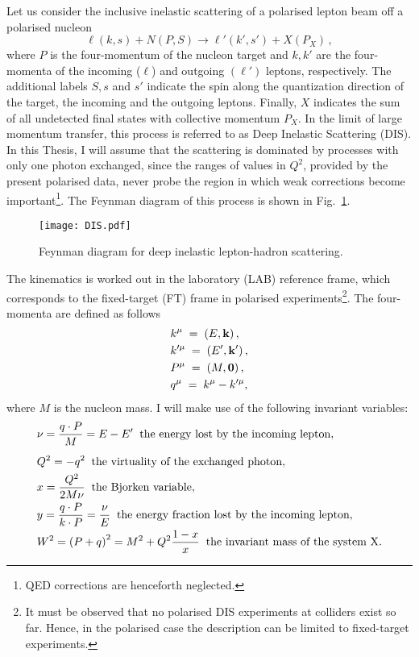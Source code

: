 Let us consider the inclusive inelastic scattering of a polarised lepton beam off a polarised nucleon
\begin{equation}
    \ell(k,s) + N(P, S) \longrightarrow \ell'(k',s') + X(P_X) \,,
    \label{eq:DIS}
\end{equation}
where $P$ is the four-momentum of the nucleon target and $k,k'$ are the four-momenta of the incoming ($\ell$) and outgoing $(\ell')$ leptons, respectively. The additional labels $S,s$ and $s'$ indicate the spin along the quantization direction of the target, the incoming and the outgoing leptons. Finally, $X$ indicates the sum of all undetected final states with collective momentum $P_X$. In the limit of large momentum transfer, this process is referred to as Deep Inelastic Scattering (DIS). In this Thesis, I will assume that the scattering is dominated by processes with only one photon exchanged, since the ranges of values in $Q^2$, provided by the present polarised data, never probe the region in which weak corrections become important\footnote{QED corrections are henceforth neglected.}. The Feynman diagram of this process is shown in Fig.~\ref{fig:DIS_Feynamn}.
\begin{figure}[t]
  \centering
  \texttt{[image: DIS.pdf]} 
  \caption{Feynman diagram for deep inelastic lepton-hadron scattering.}
  \label{fig:DIS_Feynamn}
\end{figure}
The kinematics is worked out in the laboratory (LAB) reference frame, which corresponds to the fixed-target (FT) frame in polarised experiments\footnote{\footnotesize It must be observed that no polarised DIS experiments at colliders exist so far. Hence, in the polarised case the description can be limited to fixed-target experiments.}. The four-momenta are defined as follows
\begin{equation}
    \begin{split}
        &k^{\mu} \;=\; \left(E, \vb{k} \right), \\
        &k'^{\mu} \;=\; \left(E', \vb{k'} \right), \\
        &P^{\mu} \;=\; \left(M, \vb{0} \right), \\
        &q^{\mu} \; = \; k^{\mu} - k'^{\mu},
    \end{split}
\end{equation}
where $M$ is the nucleon mass. I will make use of the following invariant variables:
\begin{align}
        & \nu = \frac{q \cdot P}{M} = E - E' \;\; \textrm{the energy lost by the incoming lepton},
        \label{eq:nu}\\[5pt]
        & Q^2 = - q^2 \;\; \textrm{the virtuality of the exchanged photon},
        \label{eq:Q2}\\
        & x=\frac{Q^2}{2M\nu} \;\; \textrm{the Bjorken variable},
        \label{eq:x}\\
        & y = \frac{q\cdot P}{k \cdot P} = \frac{\nu}{E} \; \; \textrm{the energy fraction lost by the incoming lepton},
        \label{eq:y}\\
        & W^2 = \qty(P + q)^2 = M^2 + Q^2 \frac{1-x}{x} \;\; \textrm{the invariant mass of the system X}.
        \label{eq:W2}
\end{align}
